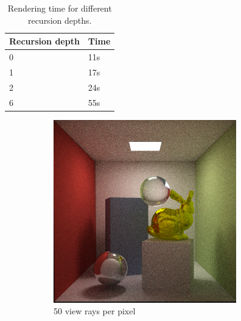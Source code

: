 \documentclass[a4paper, 12pt]{report}
\begin{document}
\begin{table}[h]
\begin{center}
	\begin{tabular}{| l | l |}
		\hline
		Recursion depth & Time \\ \hline
		0 & 11s \\ \hline
		1 & 17s \\ \hline
		2 & 24s \\ \hline
		6 & 55s \\ \hline
	\end{tabular}
	\caption{Rendering time for different recursion depths.}
	\label{tb:recursion}
\end{center}
\end{table}

\begin{figure}
        \centering
        \begin{subfigure}[h]{0.5\textwidth}
           \includegraphics[width=\textwidth]{figures/specular_50rpp-.png}
	\caption{50 view rays per pixel}
	\label{fig:50rpp}
        \end{subfigure}%
        ~ %
        \begin{subfigure}[h]{0.5\textwidth}

\end{subfigure}
\end{figure}
\end{document}
